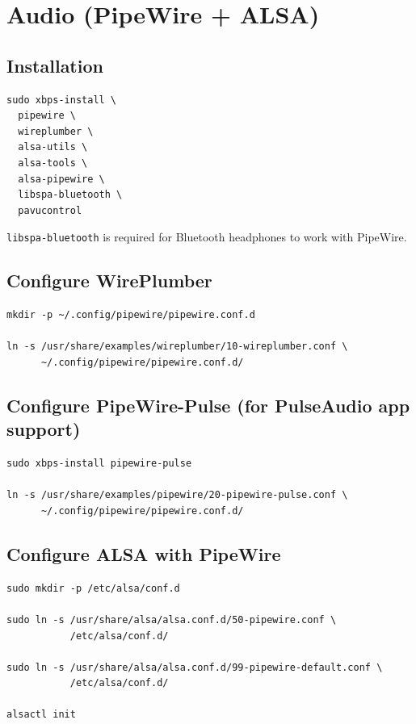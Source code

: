 \documentclass[12pt, a4paper]{book}
\begin{document}
\chapter{Audio (PipeWire + ALSA)}

\section{Installation}
\begin{lstlisting}
sudo xbps-install \
  pipewire \
  wireplumber \
  alsa-utils \
  alsa-tools \
  alsa-pipewire \
  libspa-bluetooth \
  pavucontrol
\end{lstlisting}

\begin{notebox}
\texttt{libspa-bluetooth} is required for Bluetooth headphones to work with PipeWire.
\end{notebox}

\section{Configure WirePlumber}
\begin{lstlisting}
mkdir -p ~/.config/pipewire/pipewire.conf.d

ln -s /usr/share/examples/wireplumber/10-wireplumber.conf \
      ~/.config/pipewire/pipewire.conf.d/
\end{lstlisting}

\section{Configure PipeWire-Pulse (for PulseAudio app support)}
\begin{lstlisting}
sudo xbps-install pipewire-pulse

ln -s /usr/share/examples/pipewire/20-pipewire-pulse.conf \
      ~/.config/pipewire/pipewire.conf.d/
\end{lstlisting}

\section{Configure ALSA with PipeWire}
\begin{lstlisting}
sudo mkdir -p /etc/alsa/conf.d

sudo ln -s /usr/share/alsa/alsa.conf.d/50-pipewire.conf \
           /etc/alsa/conf.d/

sudo ln -s /usr/share/alsa/alsa.conf.d/99-pipewire-default.conf \
           /etc/alsa/conf.d/

alsactl init
\end{lstlisting}
\end{document}
